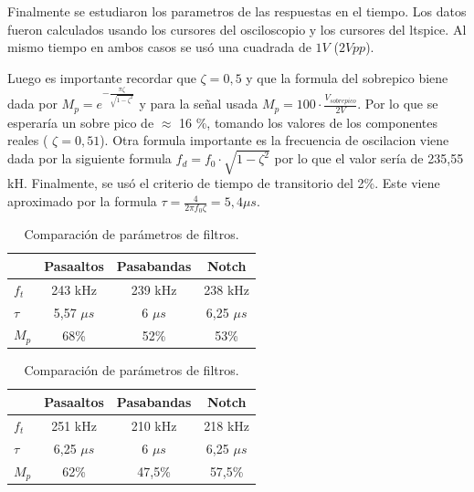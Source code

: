 Finalmente se estudiaron los parametros de las respuestas en el tiempo. Los datos fueron calculados usando los cursores del osciloscopio y los cursores del ltspice. Al mismo tiempo en ambos casos se usó una cuadrada de $1V$ ($2Vpp$). \par
Luego es importante recordar que $\zeta = 0,5 $ y que la formula del sobrepico biene dada por $M_p=e^{-\frac{\pi\zeta}{\sqrt{1-\zeta^2}}}$ y para la señal usada $M_p = 100 \cdot \frac{V_{sobrepico}}{2 V} $. Por lo que se esperaría un sobre pico de $\approx$ 16 \%, tomando los valores de los componentes reales ( $\zeta = 0,51$). Otra formula importante es la frecuencia de oscilacion viene dada por la siguiente formula $f_d = f_0 \cdot \sqrt{1-\zeta^2}$ por lo que el valor sería de 235,55 kH. Finalmente, se usó el criterio de tiempo de transitorio del 2\%. Este viene aproximado por la formula $\tau = \frac{4}{2\pi f_0 \zeta} = 5,4 \mu s$.

\begin{table}[H]
    \centering
    \begin{minipage}{0.48\textwidth}
        \centering
        \begin{tabular}{lccc}
            \toprule
            & Pasaaltos & Pasabandas & Notch \\
            \midrule
            $f_t$  & 243 kHz & 239 kHz & 238 kHz \\
            $\tau$ & 5,57 $\mu s$ & 6 $\mu s$ & 6,25 $\mu s$ \\
            $M_p$  & 68\% & 52\% & 53\% \\
            \bottomrule
        \end{tabular}
        \caption*{ (a) Resultados teóricos (LTspice)}
        \label{fig:teoricos}
    \end{minipage}
    \hfill
    \begin{minipage}{0.48\textwidth}
        \centering
        \begin{tabular}{lccc}
            \toprule
            & Pasaaltos & Pasabandas & Notch \\
            \midrule
            $f_t$  & 251 kHz & 210 kHz & 218 kHz \\
            $\tau$ & 6,25 $\mu s$ & 6 $\mu s$ & 6,25 $\mu s$ \\
            $M_p$  & 62\% & 47,5\% & 57,5\% \\
            \bottomrule
        \end{tabular}
        \caption*{ (b) Resultados experimentales}
        \label{fig:experimentales}
    \end{minipage}
    
    \vspace{1em}
    \caption{Comparación de parámetros de filtros.}
    \label{fig:comparacion_filtros}
\end{table}

